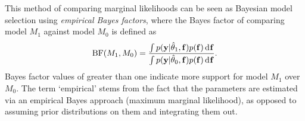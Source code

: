 \pagebreak
\begin{remark}
  This method of comparing marginal likelihoods can be seen as Bayesian model selection using \emph{empirical Bayes factors}, where the Bayes factor of comparing model $M_1$ against model $M_0$ is defined as
  \[
    \operatorname{BF}(M_1,M_0) = \frac{\int p({\mathbf y}|\hat\theta_1,{\mathbf f})p({\mathbf f}) \operatorname{d}\hspace{0.5pt}\! {\mathbf f} }{\int p({\mathbf y}|\hat\theta_0,{\mathbf f})p({\mathbf f}) \operatorname{d}\hspace{0.5pt}\! {\mathbf f}}.
  \]
  Bayes factor values of greater than one indicate more support for model $M_1$ over $M_0$.
  The term ‘empirical’ stems from the fact that the parameters are estimated via an empirical Bayes approach (maximum marginal likelihood), as opposed to assuming prior distributions on them and integrating them out.
\end{remark}
